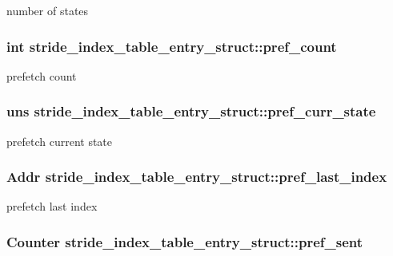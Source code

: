 \label{structstride__index__table__entry__struct_aa70fb619383a85c1043a77d156896ba4}
number of states \hypertarget{structstride__index__table__entry__struct_ab9f70927331ab13a808b07cc390d01e2}{
\subsubsection[{pref\_\-count}]{\setlength{\rightskip}{0pt plus 5cm}int {\bf stride\_\-index\_\-table\_\-entry\_\-struct::pref\_\-count}}}
\label{structstride__index__table__entry__struct_ab9f70927331ab13a808b07cc390d01e2}
prefetch count \hypertarget{structstride__index__table__entry__struct_aa63ffe040ce62a4d58b572bb755ea37f}{
\subsubsection[{pref\_\-curr\_\-state}]{\setlength{\rightskip}{0pt plus 5cm}uns {\bf stride\_\-index\_\-table\_\-entry\_\-struct::pref\_\-curr\_\-state}}}
\label{structstride__index__table__entry__struct_aa63ffe040ce62a4d58b572bb755ea37f}
prefetch current state \hypertarget{structstride__index__table__entry__struct_ab45ec7267012e2e7633c49dadf92781d}{
\subsubsection[{pref\_\-last\_\-index}]{\setlength{\rightskip}{0pt plus 5cm}Addr {\bf stride\_\-index\_\-table\_\-entry\_\-struct::pref\_\-last\_\-index}}}
\label{structstride__index__table__entry__struct_ab45ec7267012e2e7633c49dadf92781d}
prefetch last index \hypertarget{structstride__index__table__entry__struct_aded3dabc4e2feb36882e1fad32cc1838}{
\subsubsection[{pref\_\-sent}]{\setlength{\rightskip}{0pt plus 5cm}Counter {\bf stride\_\-index\_\-table\_\-entry\_\-struct::pref\_\-sent}}}
